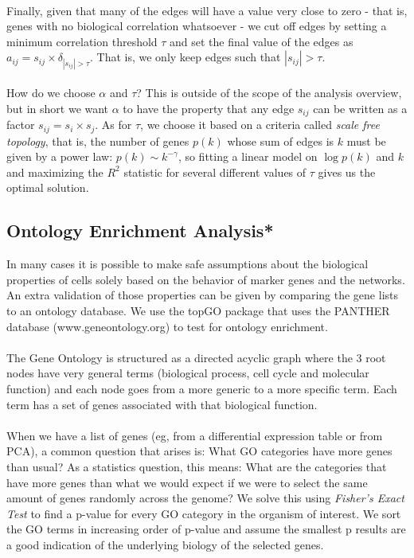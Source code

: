\\
Finally, given that many of the edges will have a value very close to zero - that is, genes with no biological correlation whatsoever - we cut off edges by setting a minimum correlation threshold $\tau$ and set the final value of the edges as $a_{ij} = s_{ij} \times \delta_{|s_{ij}| > \tau}$. That is, we only keep edges such that $|s_{ij}| > \tau$. \\
\\
How do we choose $\alpha$ and $\tau$? This is outside of the scope of the analysis overview, but in short we want $\alpha$ to have the property that any edge $s_{ij}$ can be written as a factor $s_{ij} = s_i \times s_j$. As for $\tau$, we choose it based on a criteria called \emph{scale free topology}, that is, the number of genes $p(k)$ whose sum of edges is $k$ must be given by a power law: $p(k) \sim k^{-\gamma}$, so fitting a linear model on $\log p(k)$ and $k$ and maximizing the $R^2$ statistic for several different values of $\tau$ gives us the optimal solution.

\newpage
\subsection{Ontology Enrichment Analysis*}

In many cases it is possible to make safe assumptions about the biological properties of cells solely based on the behavior of marker genes and the networks. An extra validation of those properties can be given by comparing the gene lists to an ontology database. We use the topGO package \cite{} that uses the PANTHER database (www.geneontology.org) to test for ontology enrichment. \\
\\
The Gene Ontology is structured as a directed acyclic graph where the 3 root nodes have very general terms (biological process, cell cycle and molecular function) and each node goes from a more generic to a more specific term. Each term has a set of genes associated with that biological function. \\
\\
When we have a list of genes (eg, from a differential expression table or from PCA), a common question that arises is: What GO categories have more genes than usual? As a statistics question, this means: What are the categories that have more genes than what we would expect if we were to select the same amount of genes randomly across the genome? We solve this using \emph{Fisher's Exact Test} to find a p-value for every GO category in the organism of interest. We sort the GO terms in increasing order of p-value and assume the smallest p results are a good indication of the underlying biology of the selected genes.

